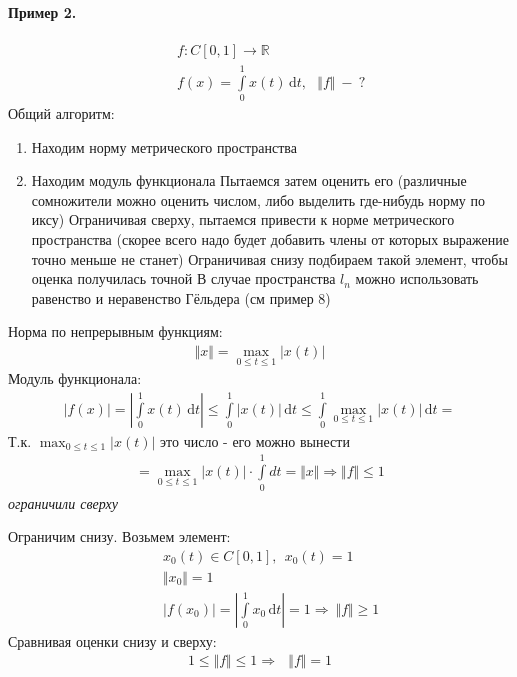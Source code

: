 \documentclass{article}[12pt]
\renewcommand{\d}{\,\mathrm{d}}
\newcommand{\R}{\mathbb{R}}
\begin{document}
\paragraph{Пример 2.}
\begin{eqnarray*}
    &&f:C[0,1]\to\R\\
    &&f(x)=\int\limits_{0}^{1}x(t)\d{t},\ \ \ \Vert f \Vert\ -\ ?
\end{eqnarray*}
Общий алгоритм:
\begin{enumerate}
    \item Находим норму метрического пространства
    \item Находим модуль функционала
        \subitem Пытаемся затем оценить его (различные сомножители можно
        оценить числом, либо выделить где-нибудь норму по иксу)
        \subitem Ограничивая сверху, пытаемся привести к норме
        метрического пространства (скорее всего надо будет добавить
        члены от которых выражение точно меньше не станет)
        \subitem Ограничивая снизу подбираем такой элемент, чтобы оценка
        получилась точной
        \subsubitem В случае пространства $l_{n}$ можно использовать
        равенство и неравенство Гёльдера (см пример 8)
\end{enumerate}

Норма по непрерывным функциям:
\begin{eqnarray*}
    \Vert x \Vert =\max_{0\leqslant t\leqslant 1}|x(t)|
\end{eqnarray*}
Модуль функционала:
\begin{eqnarray*}
    |f(x)|=\left|\int\limits_{0}^{1}x(t)\d{t}\right|
    \leqslant\int\limits_{0}^{1}|x(t)|\d{t}
    \leqslant\int\limits_{0}^{1}\max_{0\leqslant t\leqslant 1}|x(t)|\d{t}=
\end{eqnarray*}
Т.к. $\max_{0\leqslant t\leqslant 1}|x(t)|$ это число - его можно
вынести
\begin{eqnarray*}
    =\max_{0\leqslant t\leqslant 1}|x(t)|\cdot\int\limits_{0}^{1}dt
    =\Vert x \Vert \Rightarrow \Vert f \Vert \leqslant 1
\end{eqnarray*}
\textit{ограничили сверху}
\par Ограничим снизу. Возьмем элемент:
\begin{eqnarray*}
    &&x_{0}(t)\in C[0,1],\ \ x_{0}(t)=1\\
    &&\Vert x_{0} \Vert =1\\
    &&|f(x_{0})|=\left|\int\limits_{0}^{1}x_{0}\d{t}\right|=1
    \Rightarrow\ \Vert f \Vert \geqslant 1
\end{eqnarray*}
Сравнивая оценки снизу и сверху:
\begin{eqnarray*}
1\leqslant \Vert f \Vert \leqslant 1
\Rightarrow\ \ \ \Vert f \Vert =1
\end{eqnarray*}
\end{document}
